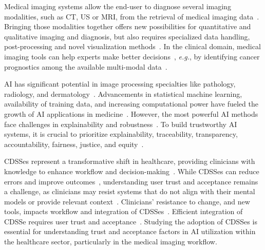 Medical imaging systems allow the end-user to diagnose several imaging modalities, such as \ac{CT}, \ac{US} or \ac{MRI}, from the retrieval of medical imaging data~\cite{WO2022071818A1, faraji2019radiologic, seifabadi2019correlation}.
Bringing those modalities together offers new possibilities for quantitative and qualitative imaging and diagnosis, but also requires specialized data handling, post-processing and novel visualization methods~\cite{Igarashi:2016:IVS:2984511.2984537, Ocegueda-Hernandez:2016:CMN:2876456.2879485, Sousa:2017:VVR:3025453.3025566}.
In the clinical domain, medical imaging tools can help experts make better decisions~\cite{Lopes:2017:UHC:3143820.3144118}, {\it e.g.}, by identifying cancer prognostics among the available multi-modal data~\cite{calisto2017mimbcdui, lopes2018interaction}.

\ac{AI} has significant potential in image processing specialties like pathology, radiology, and dermatology~\cite{EVANS2022281, MULLER202267}.
Advancements in statistical machine learning, availability of training data, and increasing computational power have fueled the growth of \ac{AI} applications in medicine~\cite{10.1145/3399715.3399744}.
However, the most powerful \ac{AI} methods face challenges in explainability and robustness~\cite{make4020026}.
To build trustworthy \ac{AI} systems, it is crucial to prioritize explainability, traceability, transparency, accountability, fairness, justice, and equity~\cite{10.1007/978-3-030-93736-2_33, 9473208}.

\acp{CDSSe} represent a transformative shift in healthcare, providing clinicians with knowledge to enhance workflow and decision-making~\cite{10.1145/3290605.3300234, edge2019clinical, hwang2019artificial}.
While \acp{CDSSe} can reduce errors and improve outcomes~\cite{Cai:2019:EEE:3301275.3302289, 10.1145/3290605.3300234}, understanding user trust and acceptance remains a challenge, as clinicians may resist systems that do not align with their mental models or provide relevant context~\cite{khairat2018reasons, kohli2018cad, yang2016investigating}.
Clinicians' resistance to change, and new tools, impacts workflow and integration of \acp{CDSSe}~\cite{calisto2017mimbcdui, 10.1145/3132272.3134111, gagnon2014electronic}.
Efficient integration of \ac{CDSSe} requires user trust and acceptance~\cite{eslami2012effects, jia2016effects, Sutton2020}.
Studying the adoption of \acp{CDSSe} is essential for understanding trust and acceptance factors in AI utilization within the healthcare sector, particularly in the medical imaging workflow.

